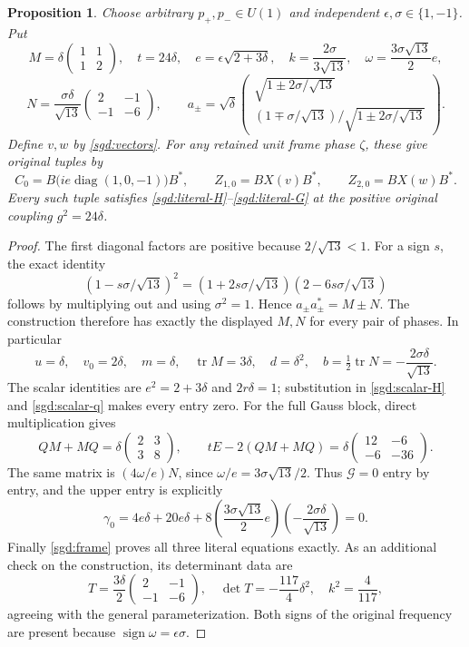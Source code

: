 \documentclass[11pt]{article}
\newtheorem{proposition}{Proposition}
\newcommand{\tr}{\operatorname{tr}}
\newcommand{\diag}{\operatorname{diag}}
\begin{document}
\begin{proposition}\label{sgd:explicit-point}
Choose arbitrary $p_+,p_-\in U(1)$ and independent
$\epsilon,\sigma\in\{1,-1\}$. Put
\[
 M=\delta\begin{pmatrix}1&1\\1&2\end{pmatrix},\quad
 t=24\delta,\quad
 e=\epsilon\sqrt{2+3\delta},\quad
 k=\frac{2\sigma}{3\sqrt{13}},\quad
 \omega=\frac{3\sigma\sqrt{13}}2e,
\]
\[
 N=\frac{\sigma\delta}{\sqrt{13}}
        \begin{pmatrix}2&-1\\-1&-6\end{pmatrix},\qquad
 a_\pm=\sqrt\delta\begin{pmatrix}
 \sqrt{1\pm2\sigma/\sqrt{13}}\\[1mm]
 (1\mp\sigma/\sqrt{13})/\sqrt{1\pm2\sigma/\sqrt{13}}
 \end{pmatrix}.
\]
Define $v,w$ by \eqref{sgd:vectors}. For any retained unit frame
phase $\zeta$, these give original tuples by
\[
 C_0=B\bigl(ie\diag(1,0,-1)\bigr)B^*,\qquad
 Z_{1,0}=BX(v)B^*,\qquad Z_{2,0}=BX(w)B^*.
\]
Every such tuple satisfies \eqref{sgd:literal-H}--\eqref{sgd:literal-G}
at the positive original coupling $g^2=24\delta$.
\end{proposition}
\begin{proof}
The first diagonal factors are positive because $2/\sqrt{13}<1$.
For a sign $s$, the exact identity
\[
 (1-s\sigma/\sqrt{13})^2
  =(1+2s\sigma/\sqrt{13})(2-6s\sigma/\sqrt{13})
\]
follows by multiplying out and using $\sigma^2=1$. Hence
$a_\pm a_\pm^*=M\pm N$. The construction therefore has exactly
the displayed $M,N$ for every pair of phases. In particular
\[
 u=\delta,\quad v_0=2\delta,\quad m=\delta,\quad
 \tr M=3\delta,\quad d=\delta^2,\quad
 b=\tfrac12\tr N=-\frac{2\sigma\delta}{\sqrt{13}}.
\]
The scalar identities are $e^2=2+3\delta$ and
$2r\delta=1$; substitution in \eqref{sgd:scalar-H} and
\eqref{sgd:scalar-q} makes every entry zero.
For the full Gauss block, direct multiplication gives
\[
 QM+MQ=\delta\begin{pmatrix}2&3\\3&8\end{pmatrix},\qquad
 tE-2(QM+MQ)
   =\delta\begin{pmatrix}12&-6\\-6&-36\end{pmatrix}.
\]
The same matrix is $(4\omega/e)N$, since
$\omega/e=3\sigma\sqrt{13}/2$. Thus $\mathcal G=0$ entry
by entry, and the upper entry is explicitly
\[
 \gamma_0=4e\delta+20e\delta
       +8\left(\frac{3\sigma\sqrt{13}}2e\right)
             \left(-\frac{2\sigma\delta}{\sqrt{13}}\right)=0.
\]
Finally \eqref{sgd:frame} proves all three literal equations exactly.
As an additional check on the construction, its determinant data are
\[
 T=\frac{3\delta}{2}\begin{pmatrix}2&-1\\-1&-6\end{pmatrix},\quad
 \det T=-\frac{117}{4}\delta^2,\quad k^2=\frac4{117},
\]
agreeing with the general parameterization. Both signs of the original
frequency are present because $\operatorname{sign}\omega=\epsilon\sigma$.
\end{proof}
\end{document}
